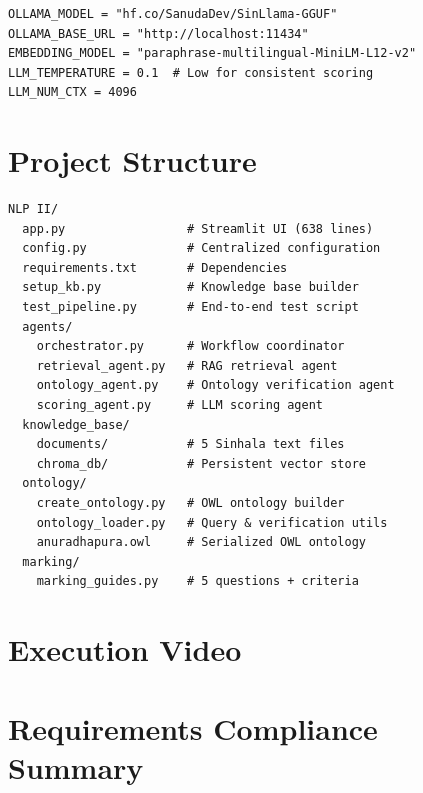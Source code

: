 \documentclass[12pt,a4paper]{article}
\begin{document}
\begin{lstlisting}[caption={Configuration (config.py)}]
OLLAMA_MODEL = "hf.co/SanudaDev/SinLlama-GGUF"
OLLAMA_BASE_URL = "http://localhost:11434"
EMBEDDING_MODEL = "paraphrase-multilingual-MiniLM-L12-v2"
LLM_TEMPERATURE = 0.1  # Low for consistent scoring
LLM_NUM_CTX = 4096
\end{lstlisting}

\section{Project Structure}

\begin{lstlisting}[language={},frame=single]
NLP II/
  app.py                 # Streamlit UI (638 lines)
  config.py              # Centralized configuration
  requirements.txt       # Dependencies
  setup_kb.py            # Knowledge base builder
  test_pipeline.py       # End-to-end test script
  agents/
    orchestrator.py      # Workflow coordinator
    retrieval_agent.py   # RAG retrieval agent
    ontology_agent.py    # Ontology verification agent
    scoring_agent.py     # LLM scoring agent
  knowledge_base/
    documents/           # 5 Sinhala text files
    chroma_db/           # Persistent vector store
  ontology/
    create_ontology.py   # OWL ontology builder
    ontology_loader.py   # Query & verification utils
    anuradhapura.owl     # Serialized OWL ontology
  marking/
    marking_guides.py    # 5 questions + criteria
\end{lstlisting}

\section{Execution Video}

\begin{center}
\end{center}

\section{Requirements Compliance Summary}
\end{document}
